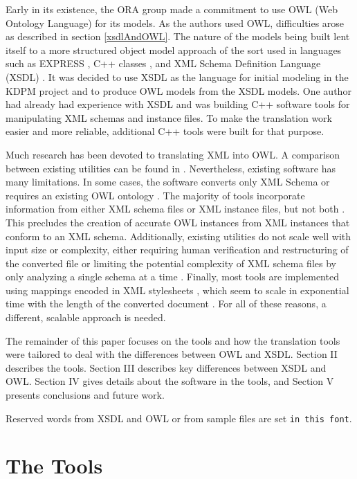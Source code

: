 \documentclass[preprint,12pt]{elsarticle}
\begin{document}
Early in its existence, the ORA group made a commitment to use OWL (Web
Ontology Language) for its models. As the authors used OWL, difficulties
arose as described in section \ref{xsdlAndOWL}. The nature of the models
being built lent itself to a more structured object model approach of the
sort used in languages such as EXPRESS \cite{express}, C++ classes \cite{c++}, and XML Schema Definition Language (XSDL)
\cite{xmlSchema0,xmlSchema1,xmlSchema2,definitive}. It was decided to use XSDL as the language for
initial modeling in the KDPM project and to produce OWL models from the
XSDL models. One author had already had experience with XSDL and was
building C++ software tools for manipulating XML schemas and instance
files. To make the translation work easier and more reliable, additional
C++ tools were built for that purpose.

Much research has been devoted to translating XML into OWL. A
comparison between existing utilities can be found in \cite{albarrak,bedini,yahia}. Nevertheless, existing software has many
limitations. In some cases, the software converts only XML Schema \cite{tsinaraki} or requires an existing OWL ontology \cite{rodriguez}. The majority of tools incorporate information
from either XML schema files or XML instance files, but not both \cite{bohring,garcia,ghawi}.  This
precludes the creation of accurate OWL instances from XML instances
that conform to an XML schema.  Additionally, existing utilities do
not scale well with input size or complexity, either requiring human
verification and restructuring of the converted file \cite{ghawi}
or limiting the potential complexity of XML schema files by only
analyzing a single schema at a time \cite{garcia}. Finally, most
tools are implemented using mappings encoded in XML stylesheets \cite{thuy,yahia,ontmalizer}, which
seem to scale in exponential time with the length of the converted
document \cite{bohring}.  For all of these reasons, a different,
scalable approach is needed.

The remainder of this paper focuses on the tools and how the translation
tools were tailored to deal with the differences between OWL and XSDL.
Section II describes the tools. Section III describes key differences
between XSDL and OWL. Section IV gives details about the software in the
tools, and Section V presents conclusions and future work.

Reserved words from XSDL and OWL or from sample files are set {\tt in
  this font}.

\section{The Tools}
\label{tools}
\end{document}
